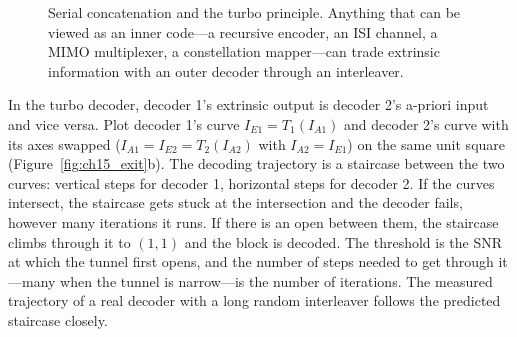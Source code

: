 \begin{figure}[htbp]\centering
{}
\caption{Serial concatenation and the turbo principle. Anything that can be viewed as an
inner code---a recursive encoder, an ISI channel, a MIMO multiplexer, a constellation mapper---can
trade extrinsic information with an outer decoder through an interleaver.}
\label{fig:ch15_serial}
\end{figure}

In the turbo decoder, decoder 1's extrinsic output is decoder 2's a-priori input and vice versa. Plot
decoder 1's curve $I_{E1}=T_1(I_{A1})$ and decoder 2's curve with its axes swapped
($I_{A1}=I_{E2}=T_2(I_{A2})$ with $I_{A2}=I_{E1}$) on the same unit square
(Figure~\ref{fig:ch15_exit}b). The decoding trajectory is a staircase between the two curves:
vertical steps for decoder 1, horizontal steps for decoder 2. If the curves intersect, the staircase
gets stuck at the intersection and the decoder fails, however many iterations it runs. If there is an
open  between them, the staircase climbs through it to $(1,1)$ and the block is decoded.
The threshold is the SNR at which the tunnel first opens, and the number of steps needed to get
through it---many when the tunnel is narrow---is the number of iterations. The measured trajectory of
a real decoder with a long random interleaver follows the predicted staircase closely.

